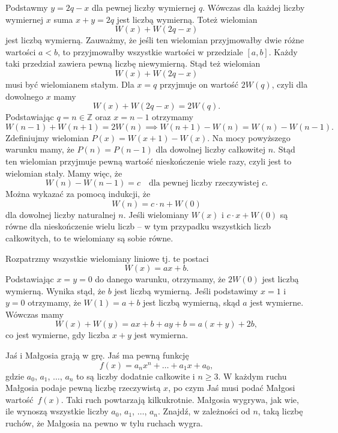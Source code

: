 \noindent
Podstawmy $y = 2q - x$ dla pewnej liczby wymiernej $q$. Wówczas dla każdej liczby wymiernej $x$ suma $x + y = 2q$ jest liczbą wymierną. Toteż wielomian
\[
	W(x) + W(2q - x)
\]
jest liczbą wymierną. Zauważmy, że jeśli ten wielomian przyjmowałby dwie różne wartości $a < b$, to przyjmowałby wszystkie wartości w przedziale $[a, b]$. Każdy taki przedział zawiera pewną liczbę niewymierną. Stąd też wielomian
\[
	W(x) + W(2q - x)
\]
musi być wielomianem stałym. Dla $x = q$ przyjmuje on wartość $2W(q)$, czyli dla dowolnego $x$ mamy
\[
	W(x) + W(2q - x) = 2W(q).
\]
Podstawiając $q = n \in \mathbb{Z}$ oraz $x = n - 1$ otrzymamy
\[
	W(n - 1) + W(n + 1) = 2W(n) \implies W(n + 1) - W(n) = W(n) - W(n - 1).
\]
Zdefiniujmy wielomian $P(x) = W(x + 1) - W(x)$. Na mocy powyższego warunku mamy, że $P(n) = P(n - 1)$ dla dowolnej liczby całkowitej $n$. Stąd ten wielomian przyjmuje pewną wartość nieskończenie wiele razy, czyli jest to wielomian stały. Mamy więc, że
\[
	W(n) - W(n - 1) = c \quad \text{dla pewnej liczby rzeczywistej } c.
\]
Można wykazać za pomocą indukcji, że 
\[
	W(n) = c \cdot n + W(0)
\]
dla dowolnej liczby naturalnej $n$. Jeśli wielomiany $W(x)$ i $c \cdot x + W(0)$ są równe dla nieskończenie wielu liczb -- w tym przypadku wszystkich liczb całkowitych, to te wielomiany są sobie równe. 

\vspace{10px}
\noindent
Rozpatrzmy wszystkie wielomiany liniowe tj. te postaci
\[
	W(x) = ax + b.
\]
Podstawiając $x = y = 0$ do danego warunku, otrzymamy, że $2W(0)$ jest liczbą wymierną. Wynika stąd, że $b$ jest liczbą wymierną. Jeśli podstawimy $x = 1$ i $y = 0$ otrzymamy, że $W(1) = a + b$ jest liczbą wymierną, skąd $a$ jest wymierne. Wówczas mamy
\[
	W(x) + W(y) = ax + b + ay + b = a(x + y) + 2b,
\]
co jest wymierne, gdy liczba $x + y$ jest wymierna.

\begin{problem}{6}
	Jaś i Małgosia grają w grę. Jaś ma pewną funkcję 
	\[
		f(x)= a_nx^n + \dots + a_1x + a_0,
	\] 
	gdzie $a_0$, $a_1$, $\dots$, $a_n$ to są liczby dodatnie całkowite i $n\geqslant 3$. W każdym ruchu Małgosia podaje pewną liczbę rzeczywistą $x$, po czym Jaś musi podać Małgosi wartość~$f(x).$ Taki ruch powtarzają kilkukrotnie. Małgosia wygrywa, jak wie, ile wynoszą wszystkie liczby $a_0$, $a_1$, $\dots$, $a_n.$ Znajdź, w zależności od $n$, taką liczbę ruchów, że Małgosia na pewno w tylu ruchach wygra.
\end{problem}



